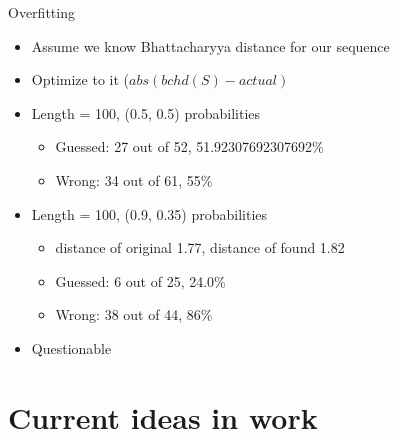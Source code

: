 \documentclass[hyperref=unicode,graphics=pdflatex,13pt]{beamer}
\begin{document}
\begin{frame}{Overfitting}
 \begin{itemize}
  \item Assume we know Bhattacharyya distance for our sequence
  \item Optimize to it ($ abs(bchd(S)-actual) $
  \item Length = 100, (0.5, 0.5) probabilities
  \begin{itemize}
   \item Guessed: 27 out of 52, 51.92307692307692\%
   \item Wrong: 34 out of 61, 55\%
  \end{itemize}
  \item Length = 100, (0.9, 0.35) probabilities
  \begin{itemize}
   \item distance of original 1.77, distance of found 1.82
   \item Guessed: 6 out of 25, 24.0\%
   \item Wrong: 38 out of 44, 86\%
  \end{itemize}
  \item Questionable
  \end{itemize}
\end{frame}



\section{Current ideas in work}
\end{document}
